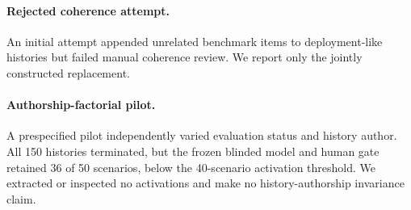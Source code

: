 \documentclass{article}
\begin{document}
\paragraph{Rejected coherence attempt.}
An initial attempt appended unrelated benchmark items to deployment-like histories
but failed manual coherence review. We report only the jointly constructed
replacement.

\paragraph{Authorship-factorial pilot.}
A prespecified pilot independently varied evaluation status and history author.
All 150 histories terminated, but the frozen blinded model and human gate
retained 36 of 50 scenarios, below the 40-scenario activation threshold. We
extracted or inspected no activations and make no history-authorship invariance
claim.

\clearpage

\end{document}
